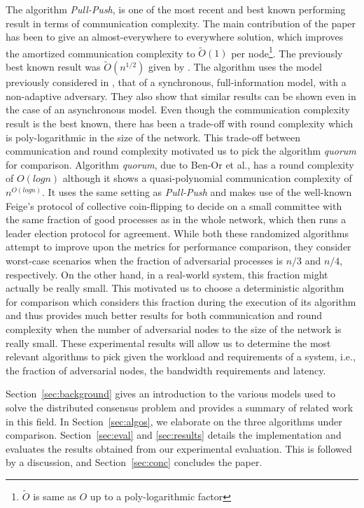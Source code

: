 The algorithm \textit{Pull-Push}, is one of the most recent and best known performing result in terms of communication complexity. The main contribution of the paper has been to give an almost-everywhere to everywhere solution, which improves the amortized communication complexity to $\tilde{O}(1)$ per node\footnote{$\tilde{O}$ is same as $O$ up to a poly-logarithmic factor}. The previously best known result was $\tilde{O}(n^{1/2})$ given by \cite{KLST11}. The algorithm uses the model previously considered in \cite{KLST11,KSSV06,BPV06,KS09}, that of a synchronous, full-information model, with a non-adaptive adversary. They also show that similar results can be shown even in the case of an asynchronous model. Even though the communication complexity result is the best known, there has been a trade-off with round complexity which is poly-logarithmic in the size of the network. This trade-off between communication and round complexity motivated us to pick the algorithm \textit{quorum} for comparison. Algorithm \textit{quorum}, due to Ben-Or et al., has a round complexity of $O(logn)$ although it shows a quasi-polynomial communication complexity of $n^{O(logn)}$. It uses the same setting as \textit{Pull-Push} and makes use of the well-known Feige's protocol of collective coin-flipping to decide on a small committee with the same fraction of good processes as in the whole network, which then runs a leader election protocol for agreement. While both these randomized algorithms attempt to improve upon the metrics for performance comparison, they consider worst-case scenarios when the fraction of adversarial processes is $n/3$ and $n/4$, respectively. On the other hand, in a real-world system, this fraction might actually be really small. This motivated us to choose a deterministic algorithm for comparison which considers this fraction during the execution of its algorithm and thus provides much better results for both communication and round complexity when the number of adversarial nodes to the size of the network is really small. These experimental results will allow us to determine the most relevant algorithms to pick given the workload and requirements of a system, i.e., the fraction of adversarial nodes, the bandwidth requirements and latency. 


Section~\ref{sec:background} gives an introduction to the various models used to solve the distributed consensus problem and provides a summary of related work in this field. In Section~\ref{sec:algos}, we elaborate on the three algorithms under comparison. Section~\ref{sec:eval} and \ref{sec:results} details the implementation and evaluates the results obtained from our experimental evaluation. This is followed by a discussion, and Section~\ref{sec:conc} concludes the paper.

